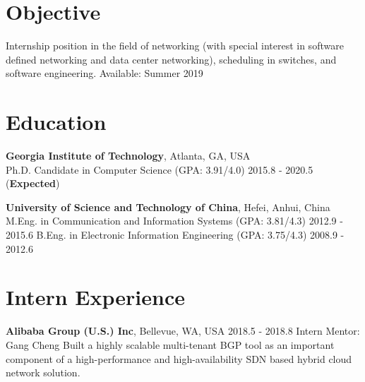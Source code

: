 \documentclass[line,11pt,letter]{/home/saber/GitHub/personal-resume/includes/cls/myRes}
\begin{document}

\address{266 Ferst Dr, Atlanta, GA 30332, United States}
\address{Cell: +1(404)697-0608. \hspace{5pt} Email: gonglong@gatech.edu}
\begin{resume}


\vspace*{-10pt}
\vspace*{-15pt}
\section{Objective}
\vspace{-4pt}
{\setlength{\parskip}{0pt}
 {Internship position in the field of networking (with special interest in software defined networking and data center networking), scheduling in switches, and software engineering. \hfill{Available: Summer 2019}\break}
}%
\negspace
\section{Education}
\vspace{-4pt}
{\setlength{\parskip}{0pt}
\textbf{Georgia Institute of Technology}, Atlanta, GA, USA\\
{\hspace*{1em} Ph.D. Candidate in Computer Science (GPA: 3.91/4.0) \hspace{52.5pt} \hfill 2015.8 - 2020.5 (\textbf{Expected})\break}
}
\sspace

{\setlength{\parskip}{0pt}
\textbf{University of Science and Technology of China}, Hefei, Anhui, China\\
{\hspace*{1em} M.Eng. in Communication and Information Systems (GPA: 3.81/4.3) \hspace{52.5pt} \hfill 2012.9 - 2015.6\break}
{\hspace*{1em} B.Eng. in Electronic Information Engineering (GPA: 3.75/4.3) \hspace{52.5pt} \hfill 2008.9 - 2012.6\break}
}
\negspace
\section{Intern Experience}
\vspace{-4pt}
{\setlength{\parskip}{0pt}
{\bf Alibaba Group (U.S.) Inc}, Bellevue, WA, USA \hfill 2018.5 - 2018.8\break
{\hspace*{1em} Intern  \hfill Mentor: Gang Cheng\break}
{\hspace*{1em} Built a highly scalable multi-tenant BGP tool as an important component of a high-performance and high-\hfill\break availability SDN based hybrid cloud network solution.\hfill\break}
}


\end{resume}
\end{document}
